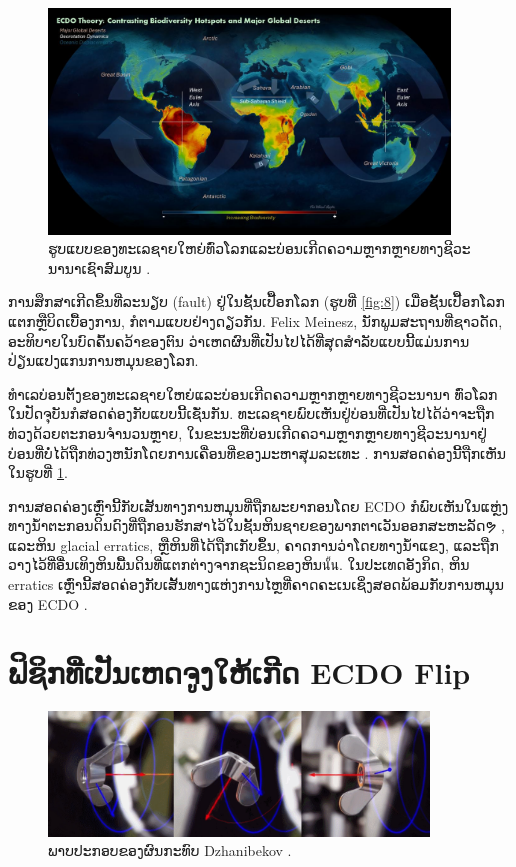\documentclass[10pt,twocolumn,letterpaper]{article}
\begin{document}
\begin{figure}[t]
\begin{center}
\includegraphics[width=0.95\textwidth]{biodiversity.jpg}
\end{center}
   \caption{ຮູບແບບຂອງທະເລຊາຍໃຫຍ່ທົ່ວໂລກແລະບ່ອນເກີດຄວາມຫຼາກຫຼາຍທາງຊີວະນານາເຊົາສົມບູນ \cite{28}.}
\label{fig:9}
\end{figure}

ການສຶກສາເກີດຂຶ້ນທີ່ລະນຽບ (fault) ຢູ່ໃນຊັ້ນເປື້ອກໂລກ (ຮູບທີ່ \ref{fig:8}) ເມື່ອຊັ້ນເປື້ອກໂລກແຕກຫຼືບິດເບື້ອງການ, ກໍຕາມແບບຢ່າງດຽວກັນ. Felix Meinesz, ນັກພູມສະຖານທີ່ຊາວດັດ, ອະທິບາຍໃນບົດຄົ້ນຄວ້າຂອງຕົນ \cite{36} ວ່າເຫດຜົນທີ່ເປັນໄປໄດ້ທີ່ສຸດສຳລັບແບບນີ້ແມ່ນການປ່ຽນແປງແກນການຫມຸນຂອງໂລກ.

ທຳເລບ່ອນຕັ້ງຂອງທະເລຊາຍໃຫຍ່ແລະບ່ອນເກີດຄວາມຫຼາກຫຼາຍທາງຊີວະນານາ ທົ່ວໂລກໃນປັດຈຸບັນກໍສອດຄ່ອງກັບແບບນີ້ເຊັ່ນກັນ. ທະເລຊາຍພົບເຫັນຢູ່ບ່ອນທີ່ເປັນໄປໄດ້ວ່າຈະຖືກທ່ວງດ້ວຍຕະກອນຈຳນວນຫຼາຍ, ໃນຂະນະທີ່ບ່ອນເກີດຄວາມຫຼາກຫຼາຍທາງຊີວະນານາຢູ່ບ່ອນທີ່ບໍ່ໄດ້ຖືກທ່ວງຫນັກໂດຍການເຄື່ອນທີ່ຂອງມະຫາສຸມລະເທະ \cite{28}. ການສອດຄ່ອງນີ້ຖືກເຫັນໃນຮູບທີ່ \ref{fig:9}.

ການສອດຄ່ອງເຫຼົ່ານີ້ກັບເສັ້ນທາງການຫມຸນທີ່ຖືກພະຍາກອນໂດຍ ECDO ກໍພົບເຫັນໃນແຫຼ່ງທາງນ້ໍາຕະກອນດິນດົງທີ່ຖືກອນຮັກສາໄວ້ໃນຊັ້ນຫິນຊາຍຂອງພາກຕາເວັນອອກສະຫະລັດຯ \cite{21}, ແລະຫິນ glacial erratics, ຫຼືຫິນທີ່ໄດ້ຖືກເກັບຂຶ້ນ, ຄາດການວ່າໂດຍທາງນໍ້າແຂງ, ແລະຖືກວາງໄວ້ທີ່ອື່ນເທິງຫິນພື້ນດິນທີ່ແຕກຕ່າງຈາກຊະນິດຂອງຫິນนั้น. ໃນປະເທດອັງກິດ, ຫິນ erratics ເຫຼົ່ານີ້ສອດຄ່ອງກັບເສັ້ນທາງແຫ່ງການໄຫຼທີ່ຄາດຄະເນເຊິ່ງສອດພ້ອມກັບການຫມຸນຂອງ ECDO \cite{67,68}.

\section{ຟິຊິກທີ່ເປັນເຫດຈູງໃຫ້ເກີດ ECDO Flip}
\begin{figure}
\begin{center}
\includegraphics[width=0.9\textwidth]{dzhani.jpg}
\end{center}
   \caption{ພາບປະກອບຂອງຜົນກະທົບ Dzhanibekov \cite{28}.}
\label{fig:10}
\end{figure}
\end{document}
